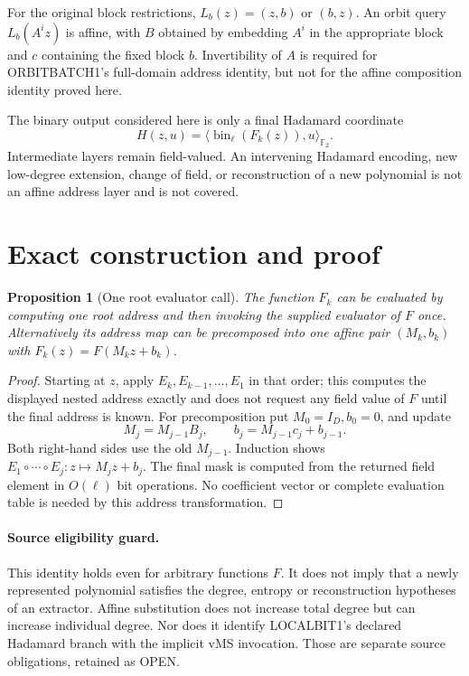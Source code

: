 \documentclass[11pt]{article}
\newtheorem{proposition}{Proposition}
\begin{document}
For the original block restrictions, $L_b(z)=(z,b)$ or $(b,z)$.
An orbit query $L_b(A^iz)$ is affine, with $B$ obtained by embedding
$A^i$ in the appropriate block and $c$ containing the fixed block $b$.
Invertibility of $A$ is required for ORBITBATCH1's full-domain address
identity, but not for the affine composition identity proved here.

The binary output considered here is only a final Hadamard coordinate
\[
 H(z,u)=\langle\operatorname{bin}_\ell(F_k(z)),u\rangle_{\mathbb F_2}.
\]
Intermediate layers remain field-valued. An intervening Hadamard encoding,
new low-degree extension, change of field, or reconstruction of a new
polynomial is not an affine address layer and is not covered.

\section*{Exact construction and proof}
\begin{proposition}[One root evaluator call]
The function $F_k$ can be evaluated by computing one root address and
then invoking the supplied evaluator of $F$ once. Alternatively its
address map can be precomposed into one affine pair $(M_k,b_k)$ with
$F_k(z)=F(M_kz+b_k)$.
\end{proposition}
\begin{proof}
Starting at $z$, apply $E_k,E_{k-1},\ldots,E_1$ in that order; this
computes the displayed nested address exactly and does not request any
field value of $F$ until the final address is known.
For precomposition put $M_0=I_D,b_0=0$, and update
\[
 M_j=M_{j-1}B_j,\qquad b_j=M_{j-1}c_j+b_{j-1}.
\]
Both right-hand sides use the old $M_{j-1}$. Induction shows
$E_1\circ\cdots\circ E_j:z\mapsto M_jz+b_j$.
The final mask is computed from the returned field element in $O(\ell)$
bit operations. No coefficient vector or complete evaluation table is
needed by this address transformation.
\end{proof}

\paragraph{Source eligibility guard.}
This identity holds even for arbitrary functions $F$. It does not imply
that a newly represented polynomial satisfies the degree, entropy or
reconstruction hypotheses of an extractor. Affine substitution does not
increase total degree but can increase individual degree. Nor does it
identify LOCALBIT1's declared Hadamard branch with the implicit vMS
invocation. Those are separate source obligations, retained as OPEN.
\end{document}
